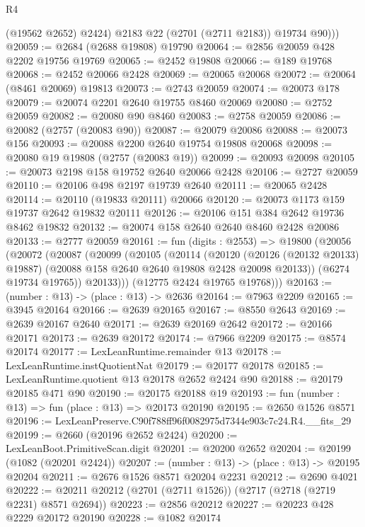\begin{lexlean}{R4}
\begin{coremodule}
            (@19562 @2652)
            @2424)
          @2183
          @22
          (@2701 (@2711 @2183))
          @19734
          @90)))
@20059 := @2684 (@2688 @19808) @19790
@20064 := @2856 @20059 @428 @2202 @19756 @19769
@20065 := @2452 @19808
@20066 := @189 @19768
@20068 := @2452 @20066 @2428
@20069 := @20065 @20068
@20072 := @20064 (@8461 @20069) @19813
@20073 := @2743 @20059
@20074 := @20073 @178
@20079 := @20074 @2201 @2640 @19755 @8460 @20069
@20080 := @2752 @20059
@20082 := @20080 @90 @8460
@20083 := @2758 @20059
@20086 := @20082 (@2757 (@20083 @90))
@20087 := @20079 @20086
@20088 := @20073 @156
@20093 := @20088 @2200 @2640 @19754 @19808 @20068
@20098 := @20080 @19 @19808 (@2757 (@20083 @19))
@20099 := @20093 @20098
@20105 := @20073 @2198 @158 @19752 @2640 @20066 @2428
@20106 := @2727 @20059
@20110 := @20106 @498 @2197 @19739 @2640
@20111 := @20065 @2428
@20114 := @20110 (@19833 @20111) @20066
@20120 := @20073 @1173 @159 @19737 @2642 @19832 @20111
@20126 := @20106 @151 @384 @2642 @19736 @8462 @19832
@20132 := @20074 @158 @2640 @2640 @8460 @2428 @20086
@20133 := @2777 @20059
@20161 := fun (digits : @2553) =>
  @19800
    (@20056
      (@20072
        (@20087
          (@20099
            (@20105
              (@20114
                (@20120
                  (@20126 (@20132 @20133) @19887)
                  (@20088 @158 @2640 @2640 @19808 @2428 @20098 @20133))
                (@6274 @19734 @19765))
              @20133)))
        (@12775 @2424 @19765 @19768)))
@20163 := (number : @13) -> (place : @13) -> @2636
@20164 := @7963 @2209
@20165 := @3945 @20164
@20166 := @2639 @20165
@20167 := @8550 @2643
@20169 := @2639 @20167 @2640
@20171 := @2639 @20169 @2642
@20172 := @20166 @20171
@20173 := @2639 @20172
@20174 := @7966 @2209
@20175 := @8574 @20174
@20177 := LexLeanRuntime.remainder @13
@20178 := LexLeanRuntime.instQuotientNat
@20179 := @20177 @20178
@20185 := LexLeanRuntime.quotient @13 @20178 @2652 @2424 @90
@20188 := @20179 @20185 @471 @90
@20190 := @20175 @20188 @19
@20193 := fun (number : @13) => fun (place : @13) => @20173 @20190
@20195 := @2650 @1526 @8571
@20196 := LexLeanPreserve.C90f788ff96f0082975d7344e903c7c24.R4.__fits_29
@20199 := @2660 (@20196 @2652 @2424)
@20200 := LexLeanBoot.PrimitiveScan.digit
@20201 := @20200 @2652
@20204 := @20199 (@1082 (@20201 @2424))
@20207 := (number : @13) -> (place : @13) -> @20195 @20204
@20211 := @2676 @1526 @8571 @20204 @2231
@20212 := @2690 @4021
@20222 := @20211 @20212 (@2701 (@2711 @1526)) (@2717 (@2718 (@2719 @2231) @8571 @2694))
@20223 := @2856 @20212
@20227 := @20223 @428 @2229 @20172 @20190
@20228 := @1082 @20174

\end{coremodule}
\end{lexlean}
